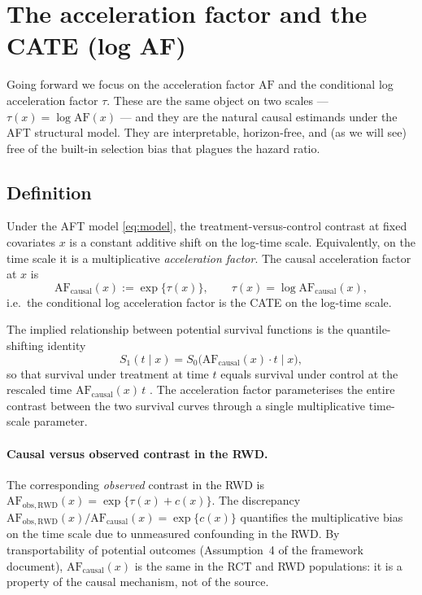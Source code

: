 \documentclass[11pt]{article}
\newcommand{\tauf}{\tau}
\newcommand{\cf}{c}
\newcommand{\Spot}{S}
\newcommand{\AF}{\mathrm{AF}}
\begin{document}
\section{The acceleration factor and the CATE (log AF)}
\label{sec:AF}

Going forward we focus on the acceleration factor $\AF$ and the
conditional log acceleration factor $\tauf$. These are the same object on
two scales --- $\tauf(x) = \log \AF(x)$ --- and they are the natural
causal estimands under the AFT structural model. They are interpretable,
horizon-free, and (as we will see) free of the built-in selection bias
that plagues the hazard ratio.

\subsection{Definition}

Under the AFT model \eqref{eq:model}, the treatment-versus-control contrast
at fixed covariates $x$ is a constant additive shift on the log-time scale.
Equivalently, on the time scale it is a multiplicative \emph{acceleration
factor}. The causal acceleration factor at $x$ is
\begin{equation}
  \AF_{\mathrm{causal}}(x) := \exp\bigl\{\tauf(x)\bigr\}, \qquad
  \tauf(x) = \log \AF_{\mathrm{causal}}(x),
  \label{eq:AF-causal}
\end{equation}
i.e.\ the conditional log acceleration factor is the CATE on the log-time
scale.

The implied relationship between potential survival functions is the
quantile-shifting identity
\begin{equation}
  \Spot_{1}(t \mid x) = \Spot_{0}\bigl(\AF_{\mathrm{causal}}(x)\cdot t \mid x\bigr),
  \label{eq:AF-shift}
\end{equation}
so that survival under treatment at time $t$ equals survival under control
at the rescaled time $\AF_{\mathrm{causal}}(x)\,t$ \citep{CoxOakes1984,
Wei1992, KalbfleischPrentice2002}. The acceleration factor parameterises the entire
contrast between the two survival curves through a single multiplicative
time-scale parameter.

\paragraph{Causal versus observed contrast in the RWD.}
The corresponding \emph{observed} contrast in the RWD is
$\AF_{\mathrm{obs, RWD}}(x) = \exp\{\tauf(x) + \cf(x)\}$. The discrepancy
$\AF_{\mathrm{obs, RWD}}(x) / \AF_{\mathrm{causal}}(x) = \exp\{\cf(x)\}$
quantifies the multiplicative bias on the time scale due to unmeasured
confounding in the RWD. By transportability of potential outcomes
(Assumption~4 of the framework document), $\AF_{\mathrm{causal}}(x)$ is the
same in the RCT and RWD populations: it is a property of the causal
mechanism, not of the source.
\end{document}
